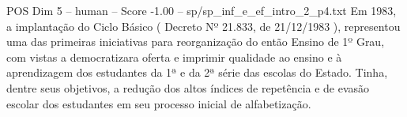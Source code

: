 \begin{textsample}{POS Dim 5 – human – Score -1.00 – sp/sp\_inf\_e\_ef\_intro\_2\_p4.txt}  \label{ex:f5_pos_020}
Em 1983, a implantação do Ciclo Básico ( Decreto Nº 21.833, de 21/12/1983 ), representou uma das primeiras iniciativas para reorganização do então Ensino de 1º Grau, com vistas a democratizara oferta e imprimir qualidade ao ensino e à aprendizagem dos estudantes da 1ª e da 2ª série das escolas do Estado.
Tinha, dentre seus objetivos, a redução dos altos índices de repetência e de evasão escolar dos estudantes em seu processo inicial de alfabetização.

\end{textsample}
